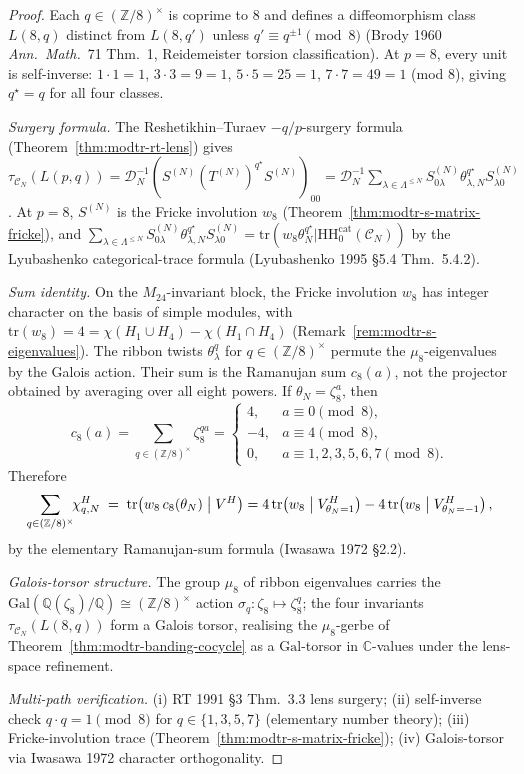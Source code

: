 \begin{proof}
Each $q\in(\mathbb Z/8)^\times$ is coprime to $8$ and defines a
diffeomorphism class $L(8, q)$ distinct from $L(8, q')$ unless
$q'\equiv q^{\pm 1}\pmod 8$ (Brody 1960 \emph{Ann.~Math.}~71 Thm.~1,
Reidemeister torsion classification). At $p = 8$, every unit is
self-inverse: $1\cdot 1 = 1$, $3\cdot 3 = 9 = 1$, $5\cdot 5 = 25 = 1$,
$7\cdot 7 = 49 = 1$ (mod $8$), giving $q^\star = q$ for all four
classes.

\emph{Surgery formula.} The Reshetikhin--Turaev $-q/p$-surgery
formula (Theorem~\ref{thm:modtr-rt-lens}) gives
\(\tau_{\mathcal C_N}(L(p, q)) =
\mathcal D_N^{-1}(S^{(N)}(T^{(N)})^{q^\star}S^{(N)})_{00}
= \mathcal D_N^{-1}
\sum_{\lambda\in\Lambda^{\leq N}}
S^{(N)}_{0\lambda}\theta_{\lambda,N}^{q^\star}
S^{(N)}_{\lambda 0}\). At $p = 8$, \(S^{(N)}\) is the
Fricke involution $w_8$
(Theorem~\ref{thm:modtr-s-matrix-fricke}), and
\(\sum_{\lambda\in\Lambda^{\leq N}}
S^{(N)}_{0\lambda}\theta_{\lambda,N}^{q^\star}S^{(N)}_{\lambda 0}
= \mathrm{tr}(w_8\theta_N^{q^\star}|
\mathrm{HH}_0^{\mathrm{cat}}(\mathcal C_N))\) by
the Lyubashenko categorical-trace formula (Lyubashenko 1995 \S 5.4
Thm.~5.4.2).

\emph{Sum identity.} On the $M_{24}$-invariant block, the Fricke
involution $w_8$ has integer character on the basis of simple modules,
with $\mathrm{tr}(w_8) = 4 = \chi(H_1\cup H_4) - \chi(H_1\cap H_4)$
(Remark~\ref{rem:modtr-s-eigenvalues}). The ribbon twists
$\theta_\lambda^q$ for $q\in(\mathbb Z/8)^\times$ permute the
\(\mu_8\)-eigenvalues by the Galois action. Their sum is the
Ramanujan sum \(c_8(a)\), not the projector obtained by averaging over
all eight powers. If \(\theta_N=\zeta_8^a\), then
\[
 c_8(a)=\sum_{q\in(\mathbb Z/8)^\times}\zeta_8^{qa}
 =
 \begin{cases}
 4,& a\equiv 0\pmod 8,\\
 -4,& a\equiv 4\pmod 8,\\
 0,& a\equiv 1,2,3,5,6,7\pmod 8.
 \end{cases}
\]
Therefore
\[
\sum_{q\in(\mathbb Z/8)^\times}\!\!\chi^H_{q,N}
 \;=\;
 \mathrm{tr}\!\left(w_8\,c_8(\theta_N)\bigm|V^H\right)
 =
 4\,\mathrm{tr}\!\left(w_8\bigm|V^H_{\theta_N=1}\right)
 -
 4\,\mathrm{tr}\!\left(w_8\bigm|V^H_{\theta_N=-1}\right),
\]
by the elementary Ramanujan-sum formula (Iwasawa 1972 \S 2.2).

\emph{Galois-torsor structure.} The group $\mu_8$ of ribbon
eigenvalues carries the $\mathrm{Gal}(\mathbb Q(\zeta_8)/\mathbb Q)
\cong (\mathbb Z/8)^\times$ action
$\sigma_q\colon\zeta_8\mapsto\zeta_8^q$; the four invariants
\(\tau_{\mathcal C_N}(L(8, q))\) form a Galois torsor, realising the
$\mu_8$-gerbe of Theorem~\ref{thm:modtr-banding-cocycle} as a
$\mathrm{Gal}$-torsor in $\mathbb C$-values under the lens-space
refinement.

\emph{Multi-path verification.}
(i) RT 1991 \S 3 Thm.~3.3 lens surgery;
(ii) self-inverse check $q\cdot q = 1\pmod 8$ for $q\in\{1,3,5,7\}$
(elementary number theory);
(iii) Fricke-involution trace
(Theorem~\ref{thm:modtr-s-matrix-fricke});
(iv) Galois-torsor via Iwasawa 1972 character orthogonality.
\end{proof}

